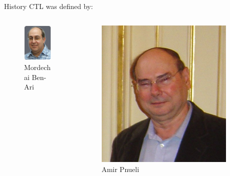 \begin{frame}{History}
    CTL was defined by:
    
    \begin{columns}[c]
        \begin{column}{.3\textwidth}
            \begin{figure}
                \includegraphics[scale=2]{images/benari.jpg}
                \caption{Mordechai Ben-Ari}
            \end{figure}
        \end{column}
        \begin{column}{.3\textwidth}
            \begin{figure}
                \includegraphics[scale=0.17]{images/Amir_Pnueli.jpg}
                \caption{Amir Pnueli}
            \end{figure}
        \end{column}
        \begin{column}{.3\textwidth}

\end{column}
\end{columns}
\end{frame}

